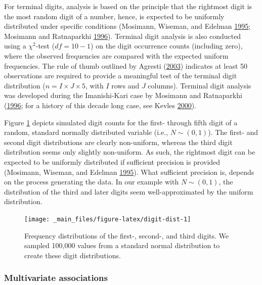 \documentclass[a5paper]{book}
\begin{document}
For terminal digits, analysis is based on the principle that the
rightmost digit is the most random digit of a number, hence, is expected
to be uniformly distributed under specific conditions (Mosimann,
Wiseman, and Edelman
\protect\hyperlink{ref-doi:10.1080ux2f08989629508573866}{1995}; Mosimann
and Ratnaparkhi
\protect\hyperlink{ref-doi:10.1080ux2f03610919608813325}{1996}).
Terminal digit analysis is also conducted using a \(\chi^2\)-test
(\(df=10-1\)) on the digit occurrence counts (including zero), where the
observed frequencies are compared with the expected uniform frequencies.
The rule of thumb outlined by Agresti
(\protect\hyperlink{ref-isbn:0471360937}{2003}) indicates at least 50
observations are required to provide a meaningful test of the terminal
digit distribution (\(n=I\times J \times 5\), with \(I\) rows and \(J\)
columns). Terminal digit analysis was developed during the Imanishi-Kari
case by Mosimann and Ratnaparkhi
(\protect\hyperlink{ref-doi:10.1080ux2f03610919608813325}{1996}; for a
history of this decade long case, see Kevles
\protect\hyperlink{ref-isbn:9780393319705}{2000}).

Figure \ref{fig:digit-dist} depicts simulated digit counts for the
first- through fifth digit of a random, standard normally distributed
variable (i.e., \(N\sim(0,1)\)). The first- and second digit
distributions are clearly non-uniform, whereas the third digit
distribution seems only slightly non-uniform. As such, the rightmost
digit can be expected to be uniformly distributed if sufficient
precision is provided (Mosimann, Wiseman, and Edelman
\protect\hyperlink{ref-doi:10.1080ux2f08989629508573866}{1995}). What
sufficient precision is, depends on the process generating the data. In
our example with \(N\sim(0,1)\), the distribution of the third and later
digits seem well-approximated by the uniform distribution.

\begin{figure}

{\centering \texttt{[image: \_main\_files/figure-latex/digit-dist-1]} 

}

\caption{Frequency distributions of the first-, second-, and third digits. We sampled 100,000 values from a standard normal distribution to create these digit distributions.}\label{fig:digit-dist}
\end{figure}

\subsubsection{Multivariate
associations}\label{multivariate-associations}
\end{document}
